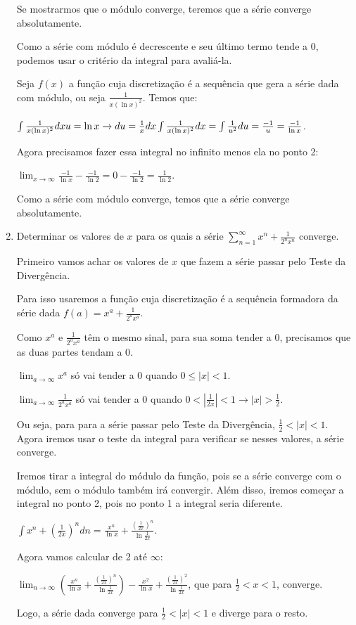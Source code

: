 \documentclass[12pt]{article}
\newcommand{\gsum}[3]{\displaystyle\sum_{#1}^#2 #3}
\begin{document}
\begin{enumerate}
  Se mostrarmos que o módulo converge, teremos que a série converge absolutamente.

  Como a série com módulo é decrescente e seu último termo tende a 0, podemos usar o critério da integral para avaliá-la.

  Seja $f(x)$ a função cuja discretização é a sequência que gera a série dada com módulo, ou seja $\frac{1}{x(\ln{x})^2}$. Temos que: 

  $\int\frac{1}{x(\ln{x})^2}dx \\ u=\ln{x} \rightarrow du=\frac{1}{x}dx \\ \int\frac{1}{x(\ln{x})^2}dx = \int\frac{1}{u^2}du = \frac{-1}{u} = \frac{-1}{\ln{x}}$.

  Agora precisamos fazer essa integral no infinito menos ela no ponto 2:

  $\displaystyle\lim_{x \to \infty}\frac{-1}{\ln{x}} - \frac{-1}{\ln{2}} = 0 - \frac{-1}{\ln{2}} = \frac{1}{\ln{2}}$.

  Como a série com módulo converge, temos que a série converge absolutamente.

\item Determinar os valores de $x$ para os quais a série $\gsum{n=1}{\infty}{x^n+\frac{1}{2^nx^n}}$ converge.

  Primeiro vamos achar os valores de $x$ que fazem a série passar pelo Teste da Divergência.

  Para isso usaremos a função cuja discretização é a sequência formadora da série dada $f(a) = x^a+\frac{1}{2^ax^a}$.

  Como $x^a$ e $\frac{1}{2^ax^a}$ têm o mesmo sinal, para sua soma tender a 0, precisamos que as duas partes tendam a 0.

  $\displaystyle\lim_{a \to \infty}x^a$ só vai tender a 0 quando $0 \leq |x|<1$.

  $\displaystyle\lim_{a \to \infty}\frac{1}{2^ax^a}$ só vai tender a 0 quando $0<|\frac{1}{2x}|<1 \rightarrow |x|>\frac{1}{2}$.

  Ou seja, para para a série passar pelo Teste da Divergência, $\frac{1}{2}<|x|<1$. Agora iremos usar o teste da integral para verificar se nesses valores, a série converge.

  Iremos tirar a integral do módulo da função, pois se a série converge com o módulo, sem o módulo também irá convergir. Além disso, iremos começar a integral no ponto 2, pois no ponto 1 a integral seria diferente.

  $\int x^n+(\frac{1}{2x})^ndn = \frac{x^n}{\ln{x}} + \frac{(\frac{1}{2x})^n}{\ln{\frac{1}{2x}}}$.

  Agora vamos calcular de 2 até $\infty$:

  $\displaystyle\lim_{n \to \infty}(\frac{x^n}{\ln{x}} + \frac{(\frac{1}{2x})^n}{\ln{\frac{1}{2x}}}) - \frac{x^2}{\ln{x}} + \frac{(\frac{1}{2x})^2}{\ln{\frac{1}{2x}}}$, que para $\frac{1}{2}<x<1$, converge.

  Logo, a série dada converge para $\frac{1}{2}<|x|<1$ e diverge para o resto.
   
\end{enumerate}
\end{document}
